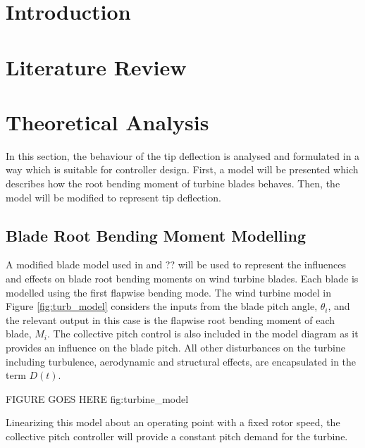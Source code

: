 






\section{Introduction}

\section{Literature Review}


\section{Theoretical Analysis}
In this section, the behaviour of the tip deflection is analysed and formulated in a way which is suitable for controller design. First, a model will be presented which describes how the root bending moment of turbine blades behaves. Then, the model will be modified to represent tip deflection.
\subsection{Blade Root Bending Moment Modelling}
A modified blade model used in \cite{1_Lu} and ?? will be used to represent the influences and effects on blade root bending moments on wind turbine blades. Each blade is modelled using the first flapwise bending mode. The wind turbine model in Figure \ref{fig:turb_model} considers the inputs from the blade pitch angle, $\theta_i$, and the relevant output in this case is the flapwise root bending moment of each blade, $M_i$. The collective pitch control is also included in the model diagram as it provides an influence on the blade pitch. All other disturbances on the turbine including turbulence, aerodynamic and structural effects, are encapsulated in the term $D(t)$.

FIGURE GOES HERE fig:turbine_model

Linearizing this model about an operating point with a fixed rotor speed, the collective pitch controller will provide a constant pitch demand for the turbine. 

